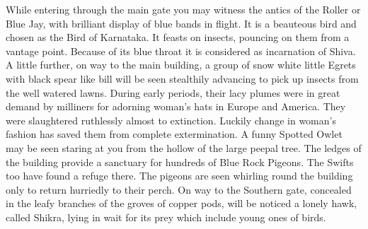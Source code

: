 \medskip
{}
While entering through the main gate you may witness the antics of 
the Roller or Blue Jay, with brilliant display of blue bands in flight. It is a 
beauteous bird and chosen as the Bird of Karnataka. It feasts on insects, 
pouncing on them from a vantage point. Because of its blue throat it is 
considered as incarnation of Shiva. A little further, on way to the main 
building, a group of snow white little Egrets with black spear like bill will be 
seen stealthily advancing to pick up insects from the well watered lawns. 
During early periods, their lacy plumes were in great demand by milliners 
for adorning woman's hats in Europe and America. They were slaughtered 
ruthlessly almost to extinction. Luckily change in woman's fashion has 
saved them from complete extermination. A funny Spotted Owlet may be 
seen staring at you from the hollow of the large peepal tree. The ledges of 
the building provide a sanctuary for hundreds of Blue Rock Pigeons. The 
Swifts too have found a refuge there. The pigeons are seen whirling round 
the building only to return hurriedly to their perch. On way to the Southern 
gate, concealed in the leafy branches of the groves of copper pods, will be 
noticed a lonely hawk, called Shikra, lying in wait for its prey which include 
young ones of birds. 

